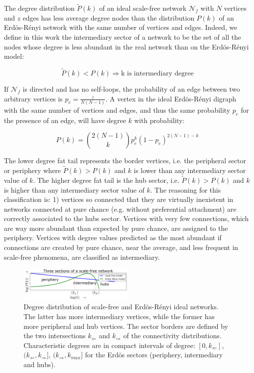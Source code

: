 \documentclass[%
 aip,
 jmp,%
 amsmath,amssymb,
 reprint,%
]{revtex4-1}
\begin{document}
The degree distribution $\widetilde{P}(k)$ of an ideal
scale-free network $\mathcal{N}_f$ with $N$ vertices and $z$ edges has less
average degree nodes than the distribution $P(k)$ of an Erd\"os-R\'enyi
network with the same number of vertices and edges. Indeed, we define in this work the intermediary sector of a network to be the set of all the nodes whose degree is less abundant in the real network than on the Erd\"os-R\'enyi model:

\begin{equation}\label{criterio}
    \widetilde{P}(k)<P(k) \Rightarrow \text{k is intermediary degree}
\end{equation}

If $\mathcal{N}_f$ is directed and has no self-loops, the probability
of an edge between two arbitrary vertices is $p_e=\frac{z}{N(N-1)}$.
A vertex in the ideal Erd\"os-R\'enyi digraph with the same number of vertices and edges, and thus the same probability $p_e$ for the presence of an edge, will have degree $k$ with probability:

\begin{equation}
    P(k)=\binom{2(N-1)}{k}p_e^k(1-p_e)^{2(N-1)-k}
\end{equation}

The lower degree fat tail represents the border vertices, i.e. the peripheral sector or periphery where $\widetilde{P}(k)>P(k)$ and $k$ is lower than any intermediary sector value of $k$. The higher degree fat tail is the hub sector, i.e. $\widetilde{P}(k)>P(k)$ and $k$ is higher than any intermediary sector value of $k$. The reasoning for this classification is: 1) vertices so connected that they are virtually inexistent in networks connected at pure chance (e.g. without preferential attachment) are correctly associated to the hubs sector. Vertices with very few connections, which are way more abundant than expected by pure chance, are assigned to the periphery. Vertices with degree values predicted as the most abundant if connections are created by pure chance, near the average, and less frequent in scale-free phenomena, are classified as intermediary.

\begin{figure}[!h]
    \centering
    \includegraphics[width=0.5\textwidth]{figs/fser_}
    \caption{Degree distribution of scale-free and Erd\"os-R\'enyi ideal networks. The latter has more
        intermediary vertices, while the former has more peripheral and hub vertices. The sector borders are defined by the two intersections $k_\Leftarrow$ and $k_\Rightarrow$ of the connectivity distributions. Characteristic degrees
    are in compact intervals of degree: $[0,k_\Leftarrow]$, $(k_\Leftarrow,k_\Rightarrow]$, $(k_\Rightarrow,k_{max}]$ for the Erd\"os sectors (periphery, intermediary and hubs).}
    \label{fig:setores}
\end{figure}
\end{document}

